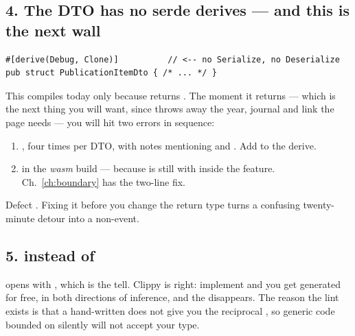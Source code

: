 \subsection{4. The DTO has no serde derives --- and this is the next wall}

\begin{lstlisting}[style=rs,caption={\file{src/publications/dto.rs}}]
#[derive(Debug, Clone)]          // <-- no Serialize, no Deserialize
pub struct PublicationItemDto { /* ... */ }
\end{lstlisting}

This compiles today only because  returns . The moment
it returns  --- which is the next thing you will want, since
 throws away the year, journal and link the page needs --- you will hit two errors
in sequence:

\begin{enumerate}
  \item {}, four times
    per DTO, with notes mentioning  and . Add
     to the derive.
  \item {} in the \emph{wasm} build --- because
     is still  with  inside the  feature.
    Ch.~\ref{ch:boundary} has the two-line  fix.
\end{enumerate}

Defect . Fixing it before you change the return type turns a confusing twenty-minute detour
into a non-event.

\subsection{5.  instead of }

 opens with , which is the
tell. Clippy is right: implement  and you get 
generated for free, in both directions of inference, and the  disappears. The reason the
lint exists is that a hand-written  does not give you the reciprocal , so
generic code bounded on  silently will not accept your type.

